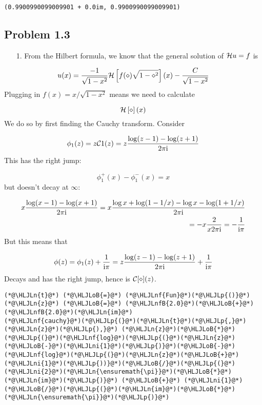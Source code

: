 \documentclass[12pt,landscape]{article}
\newcommand{\HLJLn}[1]{#1}
\newcommand{\HLJLnf}[1]{\textcolor[RGB]{66,102,213}{#1}}
\newcommand{\HLJLnfB}[1]{\textcolor[RGB]{59,151,46}{#1}}
\newcommand{\HLJLni}[1]{\textcolor[RGB]{59,151,46}{#1}}
\newcommand{\HLJLoB}[1]{\textcolor[RGB]{102,102,102}{\textbf{#1}}}
\newcommand{\HLJLp}[1]{#1}
\def\I{ {\rm i} }
\def\CC{ {\cal C} }
\def\HH{ {\cal H} }
\begin{document}
{\begin{lstlisting}
(0.9900990099009901 + 0.0im, 0.9900990099009901)
\end{lstlisting}


\subsection{Problem 1.3}
\begin{itemize}
\item[1. ] From the Hilbert formula, we know that the general solution of $\HH u = f$ is

\end{itemize}
\[
    u(x) =  {-1 \over \sqrt{1 - x^2}}\HH \left[{ f(\diamond)  \sqrt{1-\diamond^2} }\right](x)  - {C \over \sqrt{1-x^2}}
\]
Plugging in $f(x) = x/\sqrt{1-x^2}$ means we need to calculate

\[
\HH \left[{\diamond}\right](x)
\]
We do so by first finding the Cauchy transform. Consider

\[
\phi_1(z) = z \CC 1(z) = z {\log(z-1) - \log(z+1) \over 2 \pi \I}
\]
This has the right jump:

\[
\phi_1^+(x) - \phi_1^-(x) = x
\]
but doesn't decay at $\infty$:


\begin{align*}
x {\log(x-1) - \log(x+1) \over 2 \pi \I} = x {\log x + \log(1-1/x) - \log x -\log(1+1/x) \over 2 \pi \I} \\
= -x { 2 \over x 2 \pi \I}  = -{1 \over \I \pi}
\end{align*}
But this means that

\[
\phi(z) = \phi_1(z) + {1 \over \I \pi} = z {\log(z-1) - \log(z+1) \over 2 \pi \I}  + {1 \over \I \pi}
\]
Decays and has the right jump, hence is $\CC[\diamond](z)$.


\begin{lstlisting}
(*@\HLJLn{t}@*) (*@\HLJLoB{=}@*) (*@\HLJLnf{Fun}@*)(*@\HLJLp{()}@*)
(*@\HLJLn{z}@*) (*@\HLJLoB{=}@*) (*@\HLJLnfB{2.0}@*)(*@\HLJLoB{+}@*)(*@\HLJLnfB{2.0}@*)(*@\HLJLn{im}@*)
(*@\HLJLnf{cauchy}@*)(*@\HLJLp{(}@*)(*@\HLJLn{t}@*)(*@\HLJLp{,}@*) (*@\HLJLn{z}@*)(*@\HLJLp{),}@*) (*@\HLJLn{z}@*)(*@\HLJLoB{*}@*)(*@\HLJLp{(}@*)(*@\HLJLnf{log}@*)(*@\HLJLp{(}@*)(*@\HLJLn{z}@*)(*@\HLJLoB{-}@*)(*@\HLJLni{1}@*)(*@\HLJLp{)}@*)(*@\HLJLoB{-}@*)(*@\HLJLnf{log}@*)(*@\HLJLp{(}@*)(*@\HLJLn{z}@*)(*@\HLJLoB{+}@*)(*@\HLJLni{1}@*)(*@\HLJLp{))}@*)(*@\HLJLoB{/}@*)(*@\HLJLp{(}@*)(*@\HLJLni{2}@*)(*@\HLJLn{\ensuremath{\pi}}@*)(*@\HLJLoB{*}@*)(*@\HLJLn{im}@*)(*@\HLJLp{)}@*) (*@\HLJLoB{+}@*) (*@\HLJLni{1}@*)(*@\HLJLoB{/}@*)(*@\HLJLp{(}@*)(*@\HLJLn{im}@*)(*@\HLJLoB{*}@*)(*@\HLJLn{\ensuremath{\pi}}@*)(*@\HLJLp{)}@*)
\end{lstlisting}

}
\end{document}
